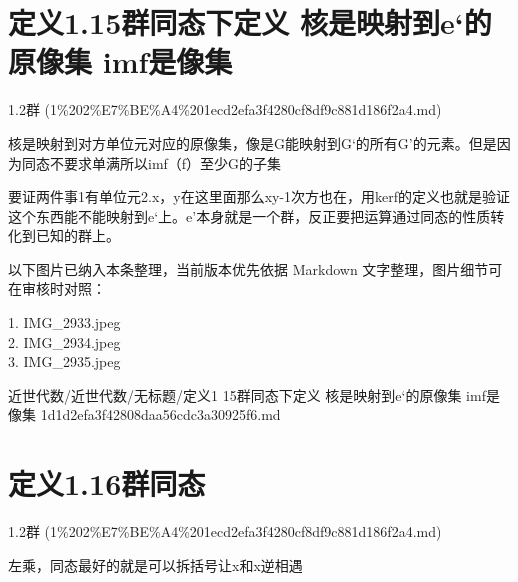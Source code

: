 \section*{定义1.15群同态下定义 核是映射到e‘的原像集 imf是像集}

\begin{note}[来源上级主题]

1.2群 (1\%202\%E7\%BE\%A4\%201ecd2efa3f4280cf8df9c881d186f2a4.md)

\end{note}

\begin{definition}

核是映射到对方单位元对应的原像集，像是G能映射到G‘的所有G’的元素。但是因为同态不要求单满所以imf（f）至少G的子集

要证两件事1有单位元2.x，y在这里面那么xy-1次方也在，用kerf的定义也就是验证这个东西能不能映射到e‘上。e’本身就是一个群，反正要把运算通过同态的性质转化到已知的群上。

\end{definition}

\begin{note}[关联图片]
以下图片已纳入本条整理，当前版本优先依据 Markdown 文字整理，图片细节可在审核时对照：

1. IMG\_2933.jpeg\\
2. IMG\_2934.jpeg\\
3. IMG\_2935.jpeg\\

\end{note}

\begin{note}[来源路径]

近世代数/近世代数/无标题/定义1 15群同态下定义 核是映射到e‘的原像集 imf是像集 1d1d2efa3f42808daa56cdc3a30925f6.md

\end{note}

\section*{定义1.16群同态}

\begin{note}[来源上级主题]

1.2群 (1\%202\%E7\%BE\%A4\%201ecd2efa3f4280cf8df9c881d186f2a4.md)

\end{note}

\begin{definition}[定义1.16群同态]

左乘，同态最好的就是可以拆括号让x和x逆相遇

\end{definition}

